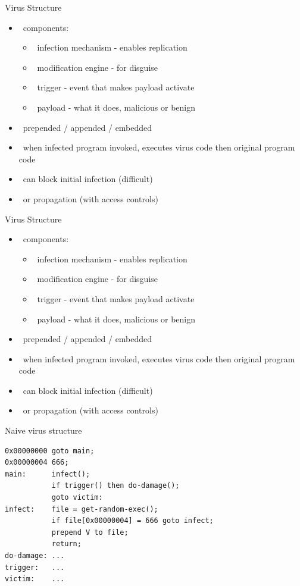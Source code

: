 \documentclass{beamer}
\begin{document}
\begin{frame}{Virus Structure }
  \begin{itemize}
  \item  components: 
    \begin{itemize}
    \item  infection mechanism - enables replication 
    \item  modification engine - for disguise 
    \item  trigger - event that makes payload activate 
    \item  payload - what it does, malicious or benign 
    \end{itemize}
  \item  prepended / appended / embedded 
  \item  when infected program invoked, executes 
    virus code then original program code 
  \item  can block initial infection (difficult)‏ 
  \item  or propagation (with access controls)
  \end{itemize}
\end{frame}

\begin{frame}{Virus Structure }
  \begin{itemize}
  \item  components: 
    \begin{itemize}
    \item  infection mechanism - enables replication 
    \item  modification engine - for disguise 
    \item  trigger - event that makes payload activate 
    \item  payload - what it does, malicious or benign 
    \end{itemize}
  \item  prepended / appended / embedded 
  \item  when infected program invoked, executes 
    virus code then original program code 
  \item  can block initial infection (difficult)‏ 
  \item  or propagation (with access controls)
  \end{itemize}
\end{frame}

\begin{frame}[fragile]{Naive virus structure}
  \begin{verbatim}
0x00000000 goto main;
0x00000004 666;
main:      infect();
           if trigger() then do-damage();
           goto victim:
infect:    file = get-random-exec();
           if file[0x00000004] = 666 goto infect;
           prepend V to file;
           return;
do-damage: ...
trigger:   ...
victim:    ...
  \end{verbatim}
\end{frame}
\end{document}
